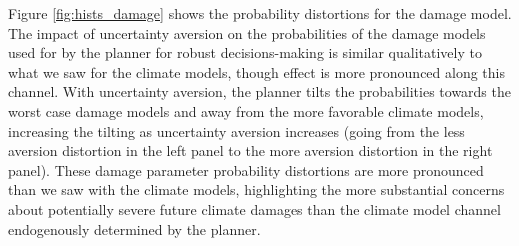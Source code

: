 \documentclass[12pt]{article}
\begin{document}
Figure \ref{fig:hists_damage} shows the probability distortions for the damage model. The impact of uncertainty aversion on the probabilities of the damage models used for by the planner for robust decisions-making is similar qualitatively to what we saw for the climate models, though effect is more pronounced along this channel. With uncertainty aversion, the planner tilts the probabilities towards the worst case damage models and away from the more favorable climate models, increasing the tilting as uncertainty aversion increases (going from the less aversion distortion in the left panel to the more aversion distortion in the right panel). These damage parameter probability distortions are more pronounced than we saw with the climate models, highlighting the more substantial concerns about potentially severe future climate damages than the climate model channel endogenously determined by the planner.
\end{document}

